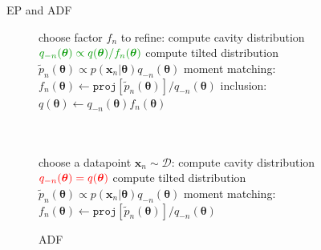\documentclass[mathserif]{beamer}
\begin{document}

\begin{frame}{EP and ADF}

\begin{figure}[!t]
\begin{minipage}[t]{0.45\linewidth}
\centering
\begin{algorithm}[H] 
\renewcommand{\thealgorithm}{}
\caption{EP} \small
\label{alg:ep} 
\begin{algorithmic}[1] 
	\STATE \small choose factor $f_n$ to refine:
	\STATE compute cavity distribution \\${\color{dkgreen}q_{-n}(\bm{\theta}) \propto q(\bm{\theta}) / f_n(\bm{\theta})}$ 
	\STATE compute tilted distribution \\$\tilde{p}_n(\bm{\theta}) \propto p(\bm{x}_n|\bm{\theta}) q_{-n}(\bm{\theta})$
	\STATE moment matching: \\ \hspace{-1mm}$f_n(\bm{\theta}) \leftarrow \mathtt{proj}[\tilde{p}_n(\bm{\theta})] / q_{-n}(\bm{\theta}) $
	\STATE inclusion:\\ $q(\bm{\theta}) \leftarrow q_{-n}(\bm{\theta}) f_n(\bm{\theta})$\\\hspace{1mm}\\ \vspace{1.5mm} \hspace{1mm}\\
\end{algorithmic}
\end{algorithm}
\end{minipage}
%
\begin{minipage}[t]{0.45\linewidth}
\centering
\begin{algorithm}[H] 
\renewcommand{\thealgorithm}{}
\caption{ADF} \small
\label{alg:adf} 
\begin{algorithmic}[1] 
	\STATE \small choose a datapoint $\bm{x}_n\sim \mathcal{D}$:
	\STATE compute cavity distribution \\${\color{red}q_{-n}(\bm{\theta}) = q(\bm{\theta})}$
	\STATE compute tilted distribution \\$\tilde{p}_n(\bm{\theta}) \propto p(\bm{x}_n|\bm{\theta}) q_{-n}(\bm{\theta})$
	\STATE moment matching: \\ \hspace{-1mm}$f_n(\bm{\theta}) \leftarrow \mathtt{proj}[\tilde{p}_n(\bm{\theta})] / q_{-n}(\bm{\theta}) $

\end{algorithmic}
\end{algorithm}
\end{minipage}
\end{figure}
\end{frame}
\end{document}
